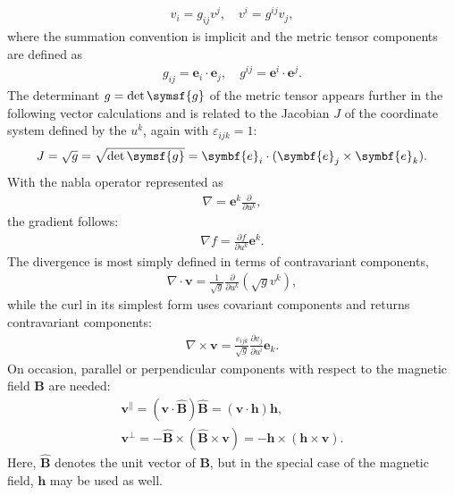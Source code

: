 \documentclass[a4paper, twoside, 10pt, english]{article}
\numberwithin{equation}{section}
\let\vec\symbf
\newcommand*\grad{\ensuremath{\nabla}}
\newcommand*\divg{\ensuremath{\nabla \cdot}}
\newcommand*\curl{\ensuremath{\nabla \times}}
\newcommand*\pd[2][]{\ensuremath{\frac{\partial #1}{\partial #2}}}  %
\begin{document}
\begin{gather}
  v_{i} = g_{ij} v^{j}, \quad v^{i} = g^{ij} v_{j},
\end{gather}
where the summation convention is implicit and the metric tensor components are defined as
\begin{gather}
  g_{ij} = \vec{e}_{i} \cdot \vec{e}_{j}, \quad g^{ij} = \vec{e}^{i} \cdot \vec{e}^{j}.
\end{gather}
The determinant $g = \det \symsf{g}$ of the metric tensor appears further in the following vector calculations and is related to the Jacobian $J$ of the coordinate system defined by the $u^{k}$, again with $\varepsilon_{ijk} = 1$:
\begin{gather}
  J = \sqrt{g} = \sqrt{\det \symsf{g}} = \vec{e}_{i} \cdot (\vec{e}_{j} \times \vec{e}_{k}).
\end{gather}
With the nabla operator represented as
\begin{gather}
  \nabla = \vec{e}^{k} \pd{u^{k}},
\end{gather}
the gradient follows:
\begin{gather}
  \grad f = \pd[f]{u^{k}} \vec{e}^{k}.
\end{gather}
The divergence is most simply defined in terms of contravariant components,
\begin{gather}
  \divg \vec{v} = \frac{1}{\sqrt{g}} \pd{u^{k}} (\sqrt{g} v^{k}),
\end{gather}
while the curl in its simplest form uses covariant components and returns contravariant components:
\begin{gather}
  \curl \vec{v} = \frac{\varepsilon_{ijk}}{\sqrt{g}} \pd[v_{j}]{u^{i}} \vec{e}_{k}.
\end{gather}
On occasion, parallel or perpendicular components with respect to the magnetic field $\vec{B}$ are needed:
\begin{gather}
  \vec{v}^{\parallel} = (\vec{v} \cdot \hat{\vec{B}}) \hat{\vec{B}} = (\vec{v} \cdot \vec{h}) \vec{h}, \\
  \vec{v}^{\perp} = -\hat{\vec{B}} \times (\hat{\vec{B}} \times \vec{v}) = -\vec{h} \times (\vec{h} \times \vec{v}).
\end{gather}
Here, $\hat{\vec{B}}$ denotes the unit vector of $\vec{B}$, but in the special case of the magnetic field, $\vec{h}$ may be used as well.
\end{document}
